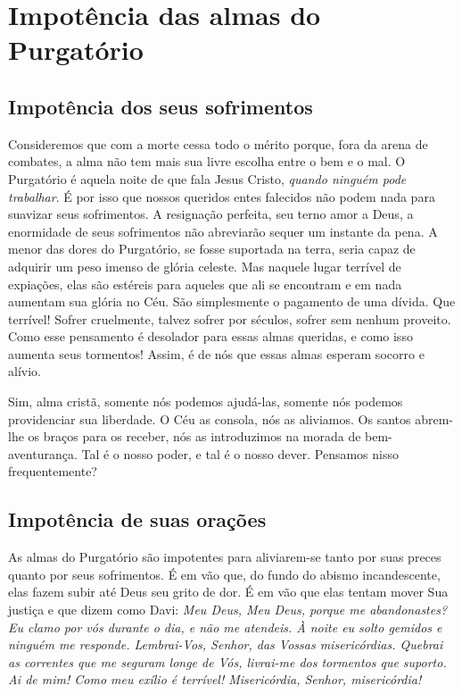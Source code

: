 \renewcommand{\thechapterdisplay}{Nono dia}
\renewcommand{\thechapterrunner}{Impotência das almas do Purgatório}
\chapter[Nono dia --- Impotência das almas do Purgatório]{Impotência das almas do Purgatório}
\section*{Impotência dos seus sofrimentos}

Consideremos que com a morte cessa todo o mérito porque, fora da arena de combates, a alma não tem mais sua livre escolha entre o bem e o mal. O Purgatório é aquela noite de que fala Jesus Cristo, \textit{quando ninguém pode trabalhar}. É por isso que nossos queridos entes falecidos não podem nada para suavizar seus sofrimentos. A resignação perfeita, seu terno amor a Deus, a enormidade de seus sofrimentos não abreviarão sequer um instante da pena. A menor das dores do Purgatório, se fosse suportada na terra, seria capaz de adquirir um peso imenso de glória celeste. Mas naquele lugar terrível de expiações, elas são estéreis para aqueles que ali se encontram e em nada aumentam sua glória no Céu. São simplesmente o pagamento de uma dívida. Que terrível! Sofrer cruelmente, talvez sofrer por séculos, sofrer sem nenhum proveito. Como esse pensamento é desolador para essas almas queridas, e como isso aumenta seus tormentos! Assim, é de nós que essas almas esperam socorro e alívio. 

Sim, alma cristã, somente nós podemos ajudá-las, somente nós podemos providenciar sua liberdade. O Céu as consola, nós as aliviamos. Os santos abrem-lhe os braços para os receber, nós as introduzimos na morada de bem-aventurança. Tal é o nosso poder, e tal é o nosso dever. Pensamos nisso frequentemente?

\section*{Impotência de suas orações}

As almas do Purgatório são impotentes para aliviarem-se tanto por suas preces quanto por seus sofrimentos. É em vão que, do fundo do abismo incandescente, elas fazem subir até Deus seu grito de dor. É em vão que elas tentam mover Sua justiça e que dizem como Davi: \textit{Meu Deus, Meu Deus, porque me abandonastes? Eu clamo por vós durante o dia, e não me atendeis. À noite eu solto gemidos e ninguém me responde. Lembrai-Vos, Senhor, das Vossas misericórdias. Quebrai as correntes que me seguram longe de Vós, livrai-me dos tormentos que suporto. Ai de mim! Como meu exílio é terrível! Misericórdia, Senhor, misericórdia!}

